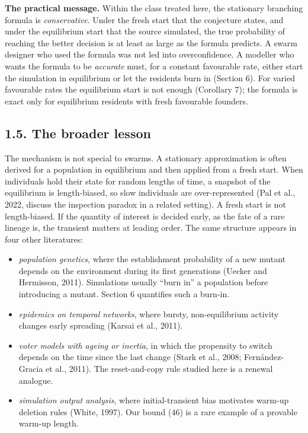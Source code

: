 \documentclass[
  british,
  11pt,
  a4paper,
]{article}
\providecommand{\tightlist}{%
  \setlength{\itemsep}{0pt}\setlength{\parskip}{0pt}}
\begin{document}
\textbf{The practical message.} Within the class treated here, the
stationary branching formula is \emph{conservative}. Under the fresh
start that the conjecture states, and under the equilibrium start that
the source simulated, the true probability of reaching the better
decision is at least as large as the formula predicts. A swarm designer
who used the formula was not led into overconfidence. A modeller who
wants the formula to be \emph{accurate} must, for a constant favourable
rate, either start the simulation in equilibrium or let the residents
burn in (Section 6). For varied favourable rates the equilibrium start
is not enough (Corollary 7); the formula is exact only for equilibrium
residents with fresh favourable founders.

\subsection{1.5. The broader lesson}\label{the-broader-lesson}

The mechanism is not special to swarms. A stationary approximation is
often derived for a population in equilibrium and then applied from a
fresh start. When individuals hold their state for random lengths of
time, a snapshot of the equilibrium is length-biased, so slow
individuals are over-represented (Pal et al., 2022, discuss the
inspection paradox in a related setting). A fresh start is not
length-biased. If the quantity of interest is decided early, as the fate
of a rare lineage is, the transient matters at leading order. The same
structure appears in four other literatures:

\begin{itemize}
\tightlist
\item
  \emph{population genetics}, where the establishment probability of a
  new mutant depends on the environment during its first generations
  (Uecker and Hermisson, 2011). Simulations usually ``burn in'' a
  population before introducing a mutant. Section 6 quantifies such a
  burn-in.
\item
  \emph{epidemics on temporal networks}, where bursty, non-equilibrium
  activity changes early spreading (Karsai et al., 2011).
\item
  \emph{voter models with ageing or inertia}, in which the propensity to
  switch depends on the time since the last change (Stark et al., 2008;
  Fernández-Gracia et al., 2011). The reset-and-copy rule studied here
  is a renewal analogue.
\item
  \emph{simulation output analysis}, where initial-transient bias
  motivates warm-up deletion rules (White, 1997). Our bound (46) is a
  rare example of a provable warm-up length.
\end{itemize}
\end{document}
